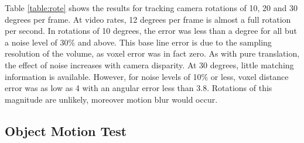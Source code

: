 \begin{table*}[ht]
\parbox{.45\linewidth}{
\centering
{}
\caption{Rotation Tracking}
\label{table:rote}
}



Table \ref{table:rote} shows the results for tracking camera rotations of 10, 20 and 30 degrees per frame. At video rates, 12 degrees per frame is almost a full rotation per second. In rotations of 10 degrees, the error was less than a degree for all but a noise level of 30\% and above. This base line error is due to the sampling resolution of the volume, as voxel error was in fact zero. As with pure translation, the effect of noise increases with camera disparity. At 30 degrees, little matching information is available. However, for noise levels of 10\% or less, voxel distance error was as low as 4 with an angular error less than 3.8. Rotations of this magnitude are unlikely, moreover motion blur would occur.

\subsection{Object Motion Test}


\end{table*}
